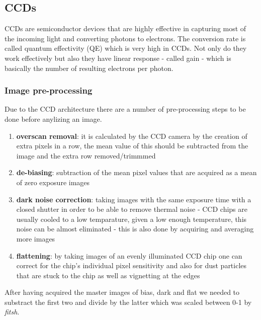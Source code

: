 \documentclass[a4paper,12pt]{article}
\begin{document}
\subsection{CCDs}

\par CCDs are semiconductor devices that are highly effective in capturing most of the
incoming light and converting photons to electrons. The conversion rate is called
quantum effectivity (QE) which is very high in CCDs.
Not only do they work effectively but also they have linear response - called gain - which
is basically the number of resulting electrons per photon.

\subsubsection{Image pre-processing}

\par Due to the CCD architecture there are a number of pre-processing steps
to be done before anylizing an image.

\begin{enumerate}
    \item \textbf{overscan removal}: it is calculated by the CCD camera by the creation of
          extra pixels in a row, the mean value of this should be subtracted from the image and the extra row
          removed/trimmmed
    \item \textbf{de-biasing}: subtraction of the mean pixel values that are acquired as a mean of zero exposure
          images
    \item \textbf{dark noise correction}: taking images with the same exposure time with a closed shutter in order
          to be able to remove thermal noise - CCD chips are usually cooled to a low temparature, given a low enough temperature, this noise
          can be almost eliminated - this is also done by acquiring and averaging more images
    \item \textbf{flattening}: by taking images of an evenly illuminated CCD chip one can correct for the chip's individual pixel sensitivity
          and also for dust particles that are stuck to the chip as well as vignetting at the edges
\end{enumerate}


\par After having acquired the master images of bias, dark and flat we needed to substract the first two and
divide by the latter which was scaled between 0-1 by \textit{fitsh}.
\end{document}
